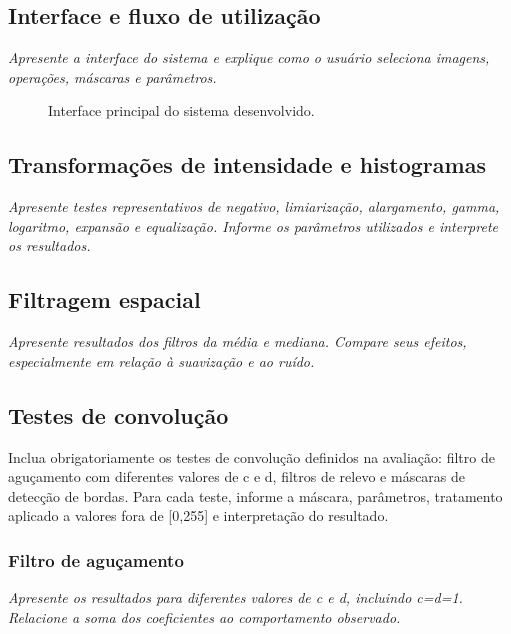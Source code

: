 \documentclass[11pt,a4paper]{article}
\newcommand{\placeholder}[1]{\textcolor{muted}{\textit{#1}}}
\begin{document}
\subsection{Interface e fluxo de utilização}
\placeholder{Apresente a interface do sistema e explique como o usuário seleciona imagens, operações, máscaras e parâmetros.}

\begin{figure}[H]
\centering
{}
\caption{Interface principal do sistema desenvolvido.}
\label{fig:interface}
\end{figure}

\subsection{Transformações de intensidade e histogramas}
\placeholder{Apresente testes representativos de negativo, limiarização, alargamento, gamma, logaritmo, expansão e equalização. Informe os parâmetros utilizados e interprete os resultados.}

\subsection{Filtragem espacial}
\placeholder{Apresente resultados dos filtros da média e mediana. Compare seus efeitos, especialmente em relação à suavização e ao ruído.}

\subsection{Testes de convolução}

\begin{orientacao}
Inclua obrigatoriamente os testes de convolução definidos na avaliação: filtro de aguçamento com diferentes valores de c e d, filtros de relevo e máscaras de detecção de bordas. Para cada teste, informe a máscara, parâmetros, tratamento aplicado a valores fora de [0,255] e interpretação do resultado.
\end{orientacao}

\subsubsection{Filtro de aguçamento}
\placeholder{Apresente os resultados para diferentes valores de c e d, incluindo c=d=1. Relacione a soma dos coeficientes ao comportamento observado.}
\end{document}
